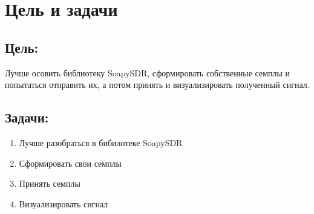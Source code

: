 \chapter{Цель и задачи}
\label{ch:intro}

\section*{\textbf{Цель:}}

Лучше осовить библиотеку SoapySDR, сформировать собственные семплы и попытаться отправить их, а потом принять и визуализировать полученный сигнал.

\section*{\textbf{Задачи:}}

\begin{enumerate}
    \item Лучше разобраться в бибилотеке SoapySDR
    \item Сформировать свои семплы
    \item Принять семплы
    \item Визуализировать сигнал
\end{enumerate}


\endinput